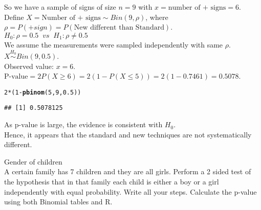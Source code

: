 \documentclass[bigtut]{tutorial}\usepackage[]{graphicx}\usepackage[]{color}
\makeatletter
\newcommand{\hlnum}[1]{\textcolor[rgb]{0.686,0.059,0.569}{#1}}%
\newcommand{\hlopt}[1]{\textcolor[rgb]{0,0,0}{#1}}%
\newcommand{\hlstd}[1]{\textcolor[rgb]{0.345,0.345,0.345}{#1}}%
\newcommand{\hlkwd}[1]{\textcolor[rgb]{0.737,0.353,0.396}{\textbf{#1}}}%
\newenvironment{kframe}{%
 \def\at@end@of@kframe{}%
 \ifinner\ifhmode%
  \def\at@end@of@kframe{\end{minipage}}%
  \begin{minipage}{\columnwidth}%
 \fi\fi%
 \def\FrameCommand##1{\hskip\@totalleftmargin \hskip-\fboxsep
 \colorbox{shadecolor}{##1}\hskip-\fboxsep
     \hskip-\linewidth \hskip-\@totalleftmargin \hskip\columnwidth}%
 \MakeFramed {\advance\hsize-\width
   \@totalleftmargin\z@ \linewidth\hsize
   \@setminipage}}%
 {\par\unskip\endMakeFramed%
 \at@end@of@kframe}
\newenvironment{knitrout}{}{} %
\makeatother
\begin{document}
\begin{tutorial}
\begin{questions}
\begin{solution}
\vspace{.3cm}
So we have a sample of signs of size $n=9$ with $x=\text{number of + signs}= 6$. \\

Define $X = \text{Number of + signs} \sim Bin(9,\rho)$, where $\rho = P(+ sign) = P(\text{New different than Standard})$. \\

$H_0: \rho=0.5  \;\; vs \;\; H_1: \rho \neq 0.5$ \\

 We assume the measurements were sampled independently with same $\rho$. \\

$X \overset{H_0}{\sim} Bin(9,0.5)$.\\
Observed value: $x=6$. \\

$\text{P-value} = 2 P(X \geq 6) = 2(1- P(X \leq 5)) 
= 2(1- 0.7461) = 0.5078$. \\

\begin{knitrout}
\color{fgcolor}\begin{kframe}
\begin{alltt}
\hlnum{2}\hlopt{*}\hlstd{(}\hlnum{1}\hlopt{-}\hlkwd{pbinom}\hlstd{(}\hlnum{5}\hlstd{,}\hlnum{9}\hlstd{,}\hlnum{0.5}\hlstd{))}
\end{alltt}
\begin{verbatim}
## [1] 0.5078125
\end{verbatim}
\end{kframe}
\end{knitrout}

 As $\text{p-value}$ is large, the evidence is consistent with $H_{0}$. \\
Hence, it appears that the standard and new techniques are not systematically different.
\end{solution}






\question Gender of children \\

A certain family has 7 children and they are all girls.
Perform a 2 sided test of the hypothesis that in that family each child is either a boy or
a girl independently with equal probability. Write all your steps. Calculate the p-value using both Binomial tables and R. 


\end{questions}
\end{tutorial}
\end{document}
